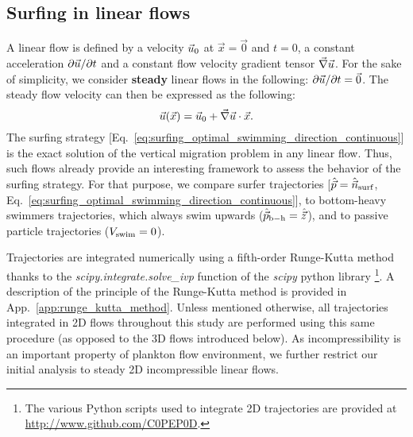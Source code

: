 \subsection{Surfing in linear flows}\label{sec:the_surfing_strategy_linear}

A linear flow is defined by a velocity $\vec{u}_0$ at $\vec{x} = \vec{0}$ and $t = 0$, a constant acceleration $\partial \vec{u} / \partial t$ and a constant flow velocity gradient tensor $\vec{\nabla} \vec{u}$.
For the sake of simplicity, we consider \textbf{steady} linear flows in the following: $\partial \vec{u} / \partial t = \vec{0}$.
The steady flow velocity can then be expressed as the following:
\begin{equation}\label{eq:linear_velocity}
	\vec{u}(\vec{x}) = \vec{u}_0 + \vec{\nabla} \vec{u} \cdot \vec{x}.
\end{equation}
The surfing strategy [Eq.~\eqref{eq:surfing_optimal_swimming_direction_continuous}] is the exact solution of the vertical migration problem in any linear flow.
Thus, such flows already provide an interesting framework to assess the behavior of the surfing strategy.
For that purpose, we compare surfer trajectories [$\hat{\vec{p}} = \hat{\vec{n}}_{\mathrm{surf}}$, Eq.~\eqref{eq:surfing_optimal_swimming_direction_continuous}], to bottom-heavy swimmers trajectories, which always swim upwards ($\hat{\vec{p}}_{\mathrm{b-h}} = \hat{\vec{z}}$), and to passive particle trajectories ($V_{\mathrm{swim}} = 0$).

Trajectories are integrated numerically using a fifth-order Runge-Kutta method \citep{dormand1980family} thanks to the \textit{scipy.integrate.solve_ivp} function of the \textit{scipy} python library \footnote{The various Python scripts used to integrate 2D trajectories are provided at \url{http://www.github.com/C0PEP0D}.}.
A description of the principle of the Runge-Kutta method is provided in App.~\ref{app:runge_kutta_method}.
Unless mentioned otherwise, all trajectories integrated in 2D flows throughout this study are performed using this same procedure (as opposed to the 3D flows introduced below).
As incompressibility is an important property of plankton flow environment, we further restrict our initial analysis to steady 2D incompressible linear flows.

